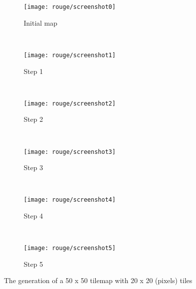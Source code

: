 \begin{figure}
	\centering
	\begin{subfigure}[b]{0.3\textwidth}
		\texttt{[image: rouge/screenshot0]}
		\caption{Initial map}
	\end{subfigure}	
	~
	\begin{subfigure}[b]{0.3\textwidth}
		\texttt{[image: rouge/screenshot1]}
		\caption{Step 1}
	\end{subfigure}	
	~
	\begin{subfigure}[b]{0.3\textwidth}
		\texttt{[image: rouge/screenshot2]}
		\caption{Step 2}
	\end{subfigure}	
	~
	\begin{subfigure}[b]{0.3\textwidth}
		\texttt{[image: rouge/screenshot3]}
		\caption{Step 3}
	\end{subfigure}		
	~
	\begin{subfigure}[b]{0.3\textwidth}
		\texttt{[image: rouge/screenshot4]}
		\caption{Step 4}
	\end{subfigure}
	~
	\begin{subfigure}[b]{0.3\textwidth}
		\texttt{[image: rouge/screenshot5]}
		\caption{Step 5}
	\end{subfigure}	
	\caption{The generation of a 50 x 50 tilemap with 20 x 20 (pixels) tiles}\label{fig:rouge:screens}
\end{figure}